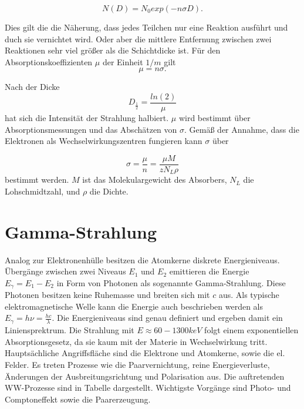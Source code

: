 \begin{equation}
N(D)=N_0 exp(-n \sigma D).
\end{equation}

Dies gilt die die Näherung, dass jedes Teilchen nur eine Reaktion ausführt und duch sie vernichtet wird. Oder aber die mittlere Entfernung zwischen zwei Reaktionen sehr viel größer als die Schichtdicke ist.
Für den Absorptionskoeffizienten $\mu$ der Einheit $1/m$ gilt
\begin{equation}
\mu=n\sigma.
\end{equation}

Nach der Dicke
\begin{equation}
D_\frac{1}{2}=\frac{ln(2)}{\mu}
\end{equation}
hat sich die Intensität der Strahlung halbiert.
$\mu$ wird bestimmt über Absorptionsmessungen und das Abschätzen von $\sigma$.
Gemäß der Annahme, dass die Elektronen als Wechselwirkungszentren fungieren kann $\sigma$ über

\begin{equation}
\sigma=\frac{\mu}{n}=\frac{\mu M}{z N_L \rho}
\end{equation}
 bestimmt werden.
$M$ ist das Molekulargewicht des Absorbers, $N_L$ die Lohschmidtzahl, und $\rho$ die Dichte.

\section{Gamma-Strahlung}

Analog zur Elektronenhülle besitzen die Atomkerne diskrete Energieniveaus. Übergänge zwischen zwei Niveaus $E_1$ und $E_2$ emittieren die Energie $E_\gamma=E_1-E_2$ in Form von Photonen als sogenannte Gamma-Strahlung. Diese Photonen besitzen keine Ruhemasse und breiten sich mit $c$ aus. Als typische elektromagnetische Welle kann die Energie auch beschrieben werden als $E_\gamma=h\nu=\frac{hc}{\lambda}$. Die Energieniveaus sind genau definiert und ergeben damit ein Liniensprektrum. 
Die Strahlung mit $E\approx 60-1300 keV$ folgt einem exponentiellen Absorptionsgesetz, da sie kaum mit der Materie in Wechselwirkung tritt. Hauptsächliche Angriffsfläche sind die Elektrone und Atomkerne, sowie die el. Felder. Es treten Prozesse wie die Paarvernichtung, reine Energieverluste, Änderungen der Ausbreitungsrichtung und Polarisation aus. Die auftretenden WW-Prozesse sind in Tabelle dargestellt. 
Wichtigste Vorgänge sind Photo- und Comptoneffekt sowie die Paarerzeugung.

